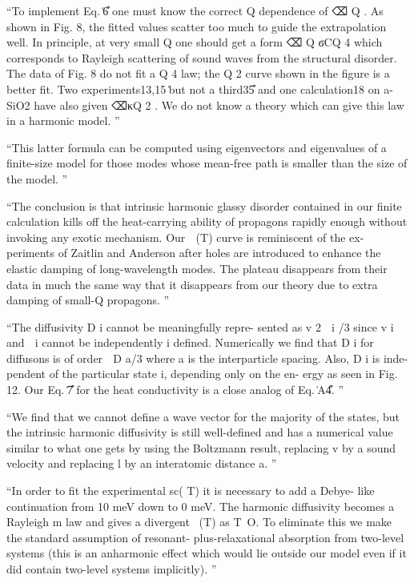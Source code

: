 \documentclass[aps,prb,preprint,superscriptaddress,amsmath,amssymb,floatfix]{revtex4}
\begin{document}
``To implement Eq. ͑6͒ one must know the
correct Q dependence of ⌫ Q . As shown in Fig. 8, the fitted
values scatter too much to guide the extrapolation well. In
principle, at very small Q one should get a form ⌫ Q ϭCQ 4
which corresponds to Rayleigh scattering of sound waves
from the structural disorder. The data of Fig. 8 do not fit a
Q 4 law; the Q 2 curve shown in the figure is a better fit. Two
experiments13,15 ͑but not a third35͒ and one calculation18 on
a-SiO2 have also given ⌫κQ 2 . We do not know a theory
which can give this law in a harmonic model.
''

``This latter formula
can be computed using eigenvectors and eigenvalues of a
finite-size model for those modes whose mean-free path is
smaller than the size of the model.
''

``The conclusion is that intrinsic harmonic glassy disorder
contained in our finite calculation kills off the heat-carrying
ability of propagons rapidly enough without invoking any
exotic mechanism. Our ␬ (T) curve is reminiscent of the ex-
periments of Zaitlin and Anderson after holes are introduced
to enhance the elastic damping of long-wavelength modes.
The plateau disappears from their data in much the same way
that it disappears from our theory due to extra damping of
small-Q propagons.
''

``The diffusivity D i cannot be meaningfully repre-
sented as v 2 ␶ i /3 since v i and ␶ i cannot be independently
i
defined. Numerically we find that D i for diffusons is of order
␻ D a/3 where a is the interparticle spacing. Also, D i is inde-
pendent of the particular state i, depending only on the en-
ergy as seen in Fig. 12. Our Eq. ͑7͒ for the heat conductivity
is a close analog of Eq. ͑A4͒.
''

``We find that we cannot define a wave vector for the
majority of the states, but the intrinsic harmonic diffusivity is still well-defined and has a numerical value
similar to what one gets by using the Boltzmann result, replacing v by a sound velocity and replacing l by
an interatomic distance a.
''\cite{feldman_thermal_1993}

``In order to fit the experimental sc( T) it is necessary to add a Debye-
like continuation from 10 meV down to 0 meV. The harmonic diffusivity becomes a Rayleigh m
law
and gives a divergent ~(T) as T~O. To eliminate this we make the standard assumption of resonant-
plus-relaxational absorption from two-level systems (this is an anharmonic effect which would lie outside
our model even if it did contain two-level systems implicitly).
''\cite{feldman_thermal_1993}
\end{document}
